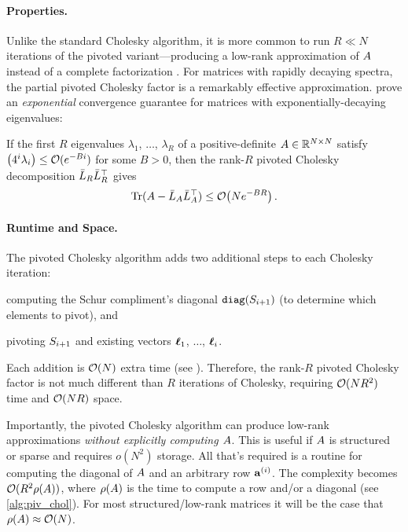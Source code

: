 \paragraph{Properties.}
Unlike the standard Cholesky algorithm, it is more common to run $R \ll N$ iterations of the pivoted variant---producing a low-rank approximation of $A$ instead of a complete factorization \cite{harbrecht2012low}.
For matrices with rapidly decaying spectra, the partial pivoted Cholesky factor is a remarkably effective approximation.
\citet{harbrecht2012low} prove an \emph{exponential} convergence guarantee for matrices with exponentially-decaying eigenvalues:
%
\begin{theorem}
\label{thm:harbrecht}
  If the first $R$ eigenvalues $\lambda_1$, $\ldots$, $\lambda_R$ of a positive-definite $A \in \mathbb{R}^{N \times N}$ satisfy $\left( 4^{i}\lambda_{i} \right) \leq \bigo{e^{-Bi}}$ for some $B>0$,
  then the rank-$R$ pivoted Cholesky decomposition $\bar{L}_{R} \bar{L}_R^\top$ gives
  \[
    \textrm{Tr}(\bA -  \bar\bL_A \bar\bL_A^\top) \leq \bigo{N e^{-BR}}.
  \]
\end{theorem}


\paragraph{Runtime and Space.}
The pivoted Cholesky algorithm adds two additional steps to each Cholesky iteration:
%
\begin{enumerate*}
  \item computing the Schur compliment's diagonal $\texttt{diag}(S_{i+1})$ (to determine which elements to pivot), and
  \item pivoting $S_{i+1}$ and existing vectors $\boldsymbol{\ell}_1$, $\ldots$, $\boldsymbol{\ell}_i$.
\end{enumerate*}
%
Each addition is $\bigo{N}$ extra time (see \citep[][Thm. 1]{harbrecht2012low}).
Therefore, the rank-$R$ pivoted Cholesky factor is not much different than $R$ iterations of Cholesky, requiring $\bigo{N R^2}$ time and $\bigo{NR}$ space.

Importantly, the pivoted Cholesky algorithm can produce low-rank approximations \emph{without explicitly computing $A$}.
This is useful if $A$ is structured or sparse and requires $o(N^2)$ storage.
All that's required is a routine for computing the diagonal of $A$ and an arbitrary row $\mathbf{a}^{(i)}$.
The complexity becomes $\bigo{R^2 \row{\bA}}$, where $\rho ( A )$ is the time to compute a row and/or a diagonal (see \cref{alg:piv_chol}).
For most structured/low-rank matrices it will be the case that $\row{\bA} \approx \bigo{N}$.


